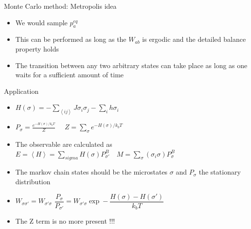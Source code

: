 \documentclass{beamer}
\begin{document}
\begin{frame}{Monte Carlo method: Metropolis idea \cite{peliti2011statistical}}

\begin{itemize}

\item We would sample $p^{eq}_{a}$ 

\item This can be performed as long as the $W_{ab}$ is ergodic and the detailed balance property holds 

\item The transition between any two arbitrary states can take place as long as one waits for a sufficient amount of time

\end{itemize}

\end{frame}

\begin{frame}{Application \cite{peliti2011statistical}}

\begin{itemize}
\item $H(\sigma)=-\sum_{\left\langle ij \right\rangle}J\sigma_{i}\sigma_{j}-\sum_{i}h\sigma_{i}$
\item $P_{\sigma}=\frac{e^{-H(\sigma)/k_{b}T}}{Z}$  $\quad Z=\sum_{\sigma}e^{-H(\sigma)/k_{b}T}$
\item The observable are calculated as $E=\left\langle H \right\rangle=\sum_{sigma}H(\sigma)P_{\sigma'}^{B} \quad M=\sum_{\sigma}\left(\sigma_{i} \sigma\right)P_{\sigma}^{B}  $
\item The markov chain states should be the microstates $\sigma$ and $P_{\sigma}$ the stationary distribution 
\item $W_{\sigma\sigma '} = W_{\sigma ' \sigma}$ $\dfrac{P_{\sigma}}{P_{\sigma '}}=W_{\sigma ' \sigma} \exp - \dfrac{H(\sigma)-H(\sigma ')}{k_{b}T}$
\item The Z term is no more present !!!
\end{itemize}

\end{frame}
\end{document}
